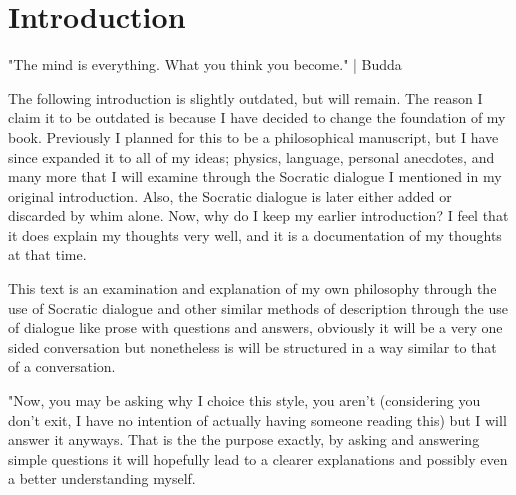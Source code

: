 
\chapter*{Introduction}
"The mind is everything. What you think you become." | Budda \\
\par The following introduction is slightly outdated, but will remain. The reason I claim it to be outdated is because I have decided to change the foundation of my book. Previously I planned for this to be a philosophical manuscript, but I have since expanded it to all of my ideas; physics, language, personal anecdotes, and many more that I will examine through the Socratic dialogue I mentioned in my original introduction. Also, the Socratic dialogue is later either added or discarded by whim alone. Now, why do I keep my earlier introduction? I feel that it does explain my thoughts very well, and it is a documentation of my thoughts at that time.
\par

\par This text is an examination and explanation of my own philosophy through the use of Socratic dialogue and other similar methods of description through the use of dialogue like prose with questions and answers, obviously it will be a very one sided conversation but nonetheless is will be structured in a way similar to that of a conversation. 

\par "Now, you may be asking why I choice this style, you aren't (considering you don't exit, I have no intention of actually having someone reading this) but I will answer it anyways. That is the the purpose exactly, by asking and answering simple questions it will hopefully lead to a clearer explanations and possibly even a better understanding myself. 

